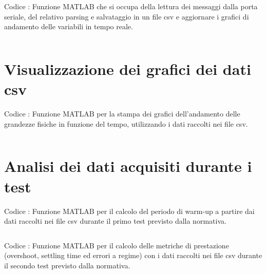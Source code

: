 \noindent{}
\label{lst:serial_read}
\noindent
Codice \thelisting: Funzione MATLAB che si occupa della lettura dei messaggi dalla porta seriale, del relativo parsing
e salvataggio in un file csv e aggiornare i grafici di andamento delle variabili in tempo reale.
\inputminted[tabsize=4]{matlab}{../matlab/serial_read.m}

\newpage

\section{Visualizzazione dei grafici dei dati csv}

\noindent{}
\label{lst:plot_csv}
\noindent
Codice \thelisting: Funzione MATLAB per la stampa dei grafici dell'andamento delle grandezze fisiche in funzione del tempo,
utilizzando i dati raccolti nei file csv.
\inputminted[tabsize=4]{matlab}{../matlab/plot_csv.m}

\newpage

\section{Analisi dei dati acquisiti durante i test}

\noindent{}
\label{lst:test1_analysis}
\noindent
Codice \thelisting: Funzione MATLAB per il calcolo del periodo di warm-up a partire dai dati raccolti nei file csv durante
il primo test previsto dalla normativa.
\inputminted[tabsize=4]{matlab}{../matlab/test1_analysis.m}

\noindent{}
\label{lst:test2_analysis}
\noindent
Codice \thelisting: Funzione MATLAB per il calcolo delle metriche di prestazione (overshoot, settling time ed errori a
regime) con i dati raccolti nei file csv durante il secondo test previsto dalla normativa.
\inputminted[tabsize=4]{matlab}{../matlab/test2_analysis.m}
